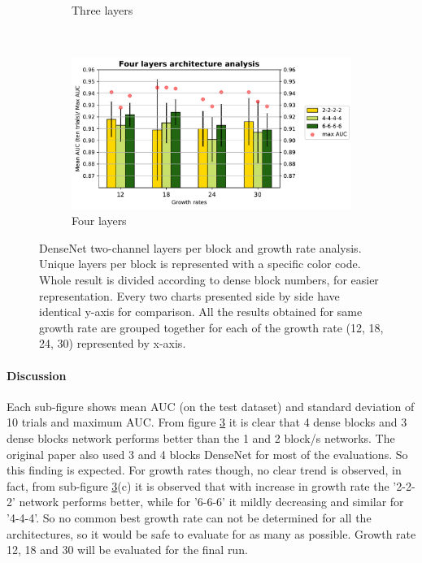 \begin{figure}
\begin{subfigure}[b]{7cm}
    \caption{Three layers }
    \label{fig:densenet_simple_three_layer_bar}
  \end{subfigure}
  ~ %
  \begin{subfigure}[b]{7cm}
    \includegraphics[width=\textwidth]{images/densenet/simple/densenet_simple_four_layer_bar}
    \caption{Four layers}
    \label{fig:densenet_simple_four_layer_bar}
  \end{subfigure} 
  \caption[DenseNet two-channel architecture analysis]{DenseNet two-channel layers per block and growth rate analysis. Unique layers per block is represented with a specific
  color code. Whole result is divided according to dense block numbers, for easier representation. Every two charts presented side by side have identical 
  y-axis for comparison. All the results obtained for same growth rate are grouped together for each of the growth rate (12, 18, 24, 30) represented by x-axis.}
  \label{fig:dense_arch_1}
\end{figure} 

\paragraph{Discussion\\}
Each sub-figure shows mean AUC (on the test dataset) and standard deviation of 10 trials and maximum AUC. From figure \ref{fig:dense_arch_1} it is clear that 4 dense blocks and 3 dense blocks network performs better
than the 1 and 2 block/s networks. The original paper \cite{densenet} also used 3 and 4 blocks DenseNet for most of the evaluations. So this finding is expected. For growth rates though, no clear trend is observed,
in fact, from sub-figure \ref{fig:dense_arch_1}(c) it is observed that with increase in growth rate the '2-2-2' network performs better, while for '6-6-6' it mildly decreasing and similar for '4-4-4'. So no common best growth rate
can not be determined for all the architectures, so it would be safe to evaluate for as many as possible. Growth rate 12, 18 and 30 will be evaluated for the final run. 

